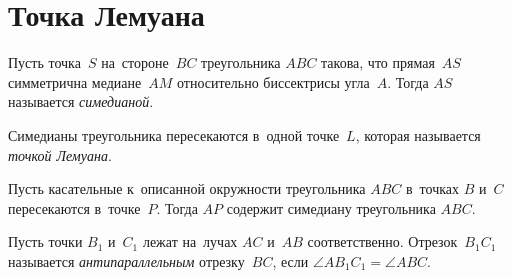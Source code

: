 
\section*{Точка Лемуана}


Пусть точка~$S$ на~стороне~$BC$ треугольника $ABC$ такова, что прямая~$AS$
симметрична медиане~$AM$ относительно биссектрисы угла~$A$.
Тогда $AS$ называется \emph{симедианой}.

Симедианы треугольника пересекаются в~одной точке~$L$, которая называется
\emph{точкой Лемуана}.

Пусть касательные к~описанной окружности треугольника $ABC$ в~точках $B$ и~$C$
пересекаются в~точке~$P$.
Тогда $AP$ содержит симедиану треугольника $ABC$.

Пусть точки $B_1$ и~$C_1$ лежат на~лучах $AC$ и~$AB$ соответственно.
Отрезок~$B_1 C_1$ называется \emph{антипараллельным} отрезку~$BC$, если
$\angle A B_1 C_1 = \angle ABC$.

